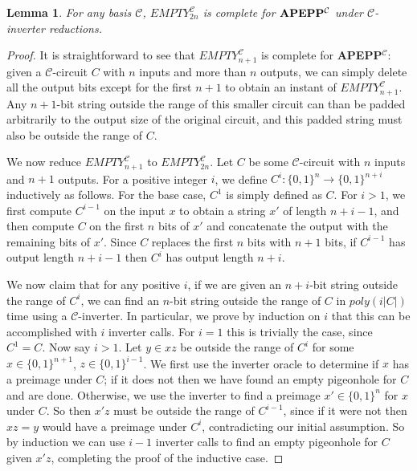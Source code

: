 \documentclass[11pt]{article}
\newtheorem{lemma}{Lemma}
\def\cl{\bf}
\begin{document}
\begin{lemma}\label{lem:swapping-sizes}
For any basis $\mathcal{C}$, {\sc $EMPTY_{2n}^{\mathcal{C}}$} is complete for ${\cl APEPP^{\mathcal{C}}}$ under $\mathcal{C}$-inverter reductions.
\end{lemma}
\begin{proof}
It is straightforward to see that {\sc $EMPTY_{n+1}^{\mathcal{C}}$} is complete for {\cl APEPP}$^{\mathcal{C}}$: given a $\mathcal{C}$-circuit $C$ with $n$ inputs and more than $n$ outputs, we can simply delete all the output bits except for the first $n+1$ to obtain an instant of {\sc $EMPTY_{n+1}^{\mathcal{C}}$}. Any $n+1$-bit string outside the range of this smaller circuit can than be padded arbitrarily to the output size of the original circuit, and this padded string must also be outside the range of $C$.

We now reduce {\sc $EMPTY_{n+1}^{\mathcal{C}}$} to {\sc $EMPTY_{2n}^{\mathcal{C}}$}. Let $C$ be some $\mathcal{C}$-circuit with $n$ inputs and $n+1$ outputs. For a positive integer $i$, we define $C^i: \{0,1\}^n \rightarrow \{0,1\}^{n + i}$ inductively as follows. For the base case, $C^1$ is simply defined as $C$. For $i > 1$, we first compute $C^{i-1}$ on the input $x$ to obtain a string $x'$ of length $n + i - 1$, and then compute $C$ on the first $n$ bits of $x'$ and concatenate the output with the remaining bits of $x'$. Since $C$ replaces the first $n$ bits with $n+1$ bits, if $C^{i-1}$ has output length $n + i-1$ then $C^i$ has output length $n + i$.

We now claim that for any positive $i$, if we are given an $n+i$-bit string outside the range of $C^i$, we can find an $n$-bit string outside the range of $C$ in $poly(i|C|)$ time using a $\mathcal{C}$-inverter. In particular, we prove by induction on $i$ that this can be accomplished with $i$ inverter calls. For $i=1$ this is trivially the case, since $C^1=C$. Now say $i > 1$. Let $y \in xz$ be outside the range of $C^i$ for some $x \in \{0,1\}^{n+1}$, $z \in \{0,1\}^{i-1}$. We first use the inverter oracle to determine if $x$ has a preimage under $C$; if it does not then we have found an empty pigeonhole for $C$ and are done. Otherwise, we use the inverter to find a preimage $x' \in \{0,1\}^n$ for $x$ under $C$. So then $x'z$ must be outside the range of $C^{i-1}$, since if it were not then $xz=y$ would have a preimage under $C^i$, contradicting our initial assumption. So by induction we can use $i-1$ inverter calls to find an empty pigeonhole for $C$ given $x'z$, completing the proof of the inductive case.


\end{proof}
\end{document}
